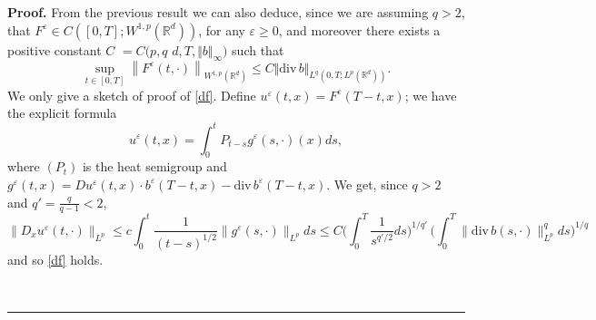 \documentclass[a4paper,11pt]{article}
\newenvironment{proof}[1][Proof]{\textbf{#1.} }{\ \rule{0.5em}{0.5em}}
\newcommand{\eps}{\varepsilon}
\begin{document}
\begin{proof}
From the previous result we can also deduce, since
we are assuming $q>2$, that  $F^{\eps} \in C( [ 0,T] ;W^{1,p}(
\mathbb{R}^{d}) )$, for any $\eps \ge 0$, and moreover there
exists a positive constant $C$ $=C(p,q$ $
 d,T, \Vert b \Vert _{\infty
})$ such that
\begin{equation} \label{df}
\sup_{t\in\left[ 0,T\right] }\left\|   F^{\eps}(  t,\cdot)
\right\| _{W^{1,p}\left( \mathbb{R}^{d}\right)  } \leq C \Vert
 \mathrm{div \,}b \Vert _{L^{q}(0,T;L^{p}(\mathbb{
R}^{d}))}.
\end{equation}
We only give a  sketch of proof of \eqref{df}.
 Define $u^{\eps} (t,x) = F^{\eps} (T-t, x)$; we
have the explicit formula
$$
 u^{\eps}(t,x) = \int_0^t P_{t-s}g^{\eps}(s, \cdot)(x) ds,
$$
where $(P_t) $ is the heat semigroup and $g^{\eps}(t,x)
 = D u^{\eps} (t,x) \cdot b^{\eps} (T-t,x)
 - {\mathrm{div}\, }b^{\eps} (T-t,x)$. We get, since $q>2$
  and $q' =\frac{q}{q-1}<2$,
$$
\| D_x u^{\eps}(t, \cdot)\|_{L^p} \le  c\int_0^t
 \frac{1}{(t-s)^{1/2}} \| g^{\eps}(s, \cdot)\|_{L^p} ds
\le C
 \Big( \int_0^T
 \frac{1}{s^{q'/2}}  ds
  \Big)^{1/q'} \, \Big( \int_0^T
   \| \mathrm{div}\,  b (s, \cdot)\|_{L^p}^{q} ds \Big)^{1/q}
$$
  and so \eqref{df} holds.

  \medskip


\end{proof}
\end{document}
